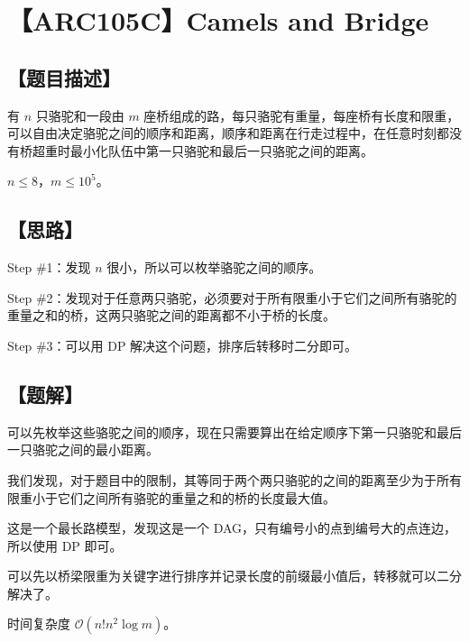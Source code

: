 \documentclass[UTF8,12pt,a4paper]{ctexart} %
\newcommand{\stress}[1]{\textbf{\CJKunderdot{#1}}}
\begin{document}
	\fontsize{12pt}{12pt}\selectfont
	
	\newpage
	\pagestyle{fancy}
	
	\section*{【ARC105C】Camels and Bridge}
	
	\subsection*{【题目描述】}
	
	有 $n$ 只骆驼和一段由 $m$ 座桥\stress{首尾相接}组成的路，每只骆驼有重量，每座桥有长度和限重，可以自由决定骆驼之间的顺序和距离，顺序和距离在行走过程中\stress{保持不变}，在任意时刻都没有桥超重时最小化队伍中第一只骆驼和最后一只骆驼之间的距离。
	
	$n\le8$，$m\le10^5$。
	
	\subsection*{【思路】}
	
	Step \#1：发现 $n$ 很小，所以可以枚举骆驼之间的顺序。
	
	Step \#2：发现对于任意两只骆驼，必须要对于所有限重小于它们之间所有骆驼的重量之和的桥，这两只骆驼之间的距离都不小于桥的长度。
	
	Step \#3：可以用 DP 解决这个问题，排序后转移时二分即可。
	
	\subsection*{【题解】}
	
	可以先枚举这些骆驼之间的顺序，现在只需要算出在给定顺序下第一只骆驼和最后一只骆驼之间的最小距离。
	
	我们发现，对于题目中的限制，其等同于两个两只骆驼的之间的距离至少为于所有限重小于它们之间所有骆驼的重量之和的桥的长度最大值。
	
	这是一个最长路模型，发现这是一个 DAG，只有编号小的点到编号大的点连边，所以使用 DP 即可。
	
	可以先以桥梁限重为关键字进行排序并记录长度的前缀最小值后，转移就可以二分解决了。
	
	时间复杂度 $\mathcal{O}(n!n^2\log m)$。
	
\end{document}
